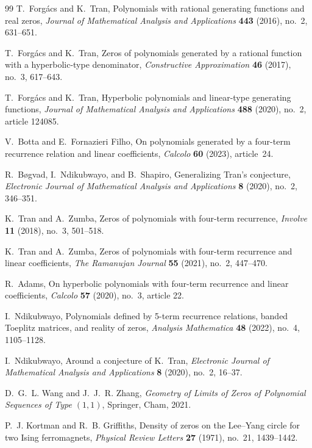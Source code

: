 \begin{thebibliography}{99}
T.~Forg\'acs and K.~Tran,
\newblock Polynomials with rational generating functions and real zeros,
\newblock \emph{Journal of Mathematical Analysis and Applications} \textbf{443} (2016), no.~2, 631--651.

T.~Forg\'acs and K.~Tran,
\newblock Zeros of polynomials generated by a rational function with a hyperbolic-type denominator,
\newblock \emph{Constructive Approximation} \textbf{46} (2017), no.~3, 617--643.

T.~Forg\'acs and K.~Tran,
\newblock Hyperbolic polynomials and linear-type generating functions,
\newblock \emph{Journal of Mathematical Analysis and Applications} \textbf{488} (2020), no.~2, article 124085.

V.~Botta and E.~Fornazieri Filho,
\newblock On polynomials generated by a four-term recurrence relation and linear coefficients,
\newblock \emph{Calcolo} \textbf{60} (2023), article~24.

R.~B{\o}gvad, I.~Ndikubwayo, and B.~Shapiro,
\newblock Generalizing Tran's conjecture,
\newblock \emph{Electronic Journal of Mathematical Analysis and Applications} \textbf{8} (2020), no.~2, 346--351.

K.~Tran and A.~Zumba,
\newblock Zeros of polynomials with four-term recurrence,
\newblock \emph{Involve} \textbf{11} (2018), no.~3, 501--518.

K.~Tran and A.~Zumba,
\newblock Zeros of polynomials with four-term recurrence and linear coefficients,
\newblock \emph{The Ramanujan Journal} \textbf{55} (2021), no.~2, 447--470.

R.~Adams,
\newblock On hyperbolic polynomials with four-term recurrence and linear coefficients,
\newblock \emph{Calcolo} \textbf{57} (2020), no.~3, article 22.

I.~Ndikubwayo,
\newblock Polynomials defined by 5-term recurrence relations, banded {T}oeplitz matrices, and reality of zeros,
\newblock \emph{Analysis Mathematica} \textbf{48} (2022), no.~4, 1105--1128.

I.~Ndikubwayo,
\newblock Around a conjecture of K.~Tran,
\newblock \emph{Electronic Journal of Mathematical Analysis and Applications} \textbf{8} (2020), no.~2, 16--37.

D.~G.~L. Wang and J.~J.~R. Zhang,
\newblock \emph{Geometry of Limits of Zeros of Polynomial Sequences of Type $(1,1)$},
\newblock Springer, Cham, 2021.

P.~J. Kortman and R.~B. Griffiths,
\newblock Density of zeros on the Lee--Yang circle for two {I}sing ferromagnets,
\newblock \emph{Physical Review Letters} \textbf{27} (1971), no.~21, 1439--1442.

\end{thebibliography}
